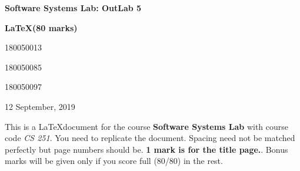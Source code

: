 \documentclass[a4paper, 12pt, fullpage]{article}
\begin{document}
\begin{titlepage}
   \begin{center}
       \vspace*{4cm}
 
       \huge \textbf{ Software Systems Lab: OutLab 5}
 
       \vspace{0.5cm}
        \huge \textbf{\LaTeX (80 marks)}
 
       \vspace{1.2cm}
 
       \Large {}
 
       \vspace{0.5cm}
      \normalsize 180050013
     
      \normalsize 180050085

      \normalsize 180050097 
      
      \vspace{1cm}
      
      \large 12 September, 2019
      
   \end{center}
\end{titlepage}

\newpage

\tableofcontents
{}
\newpage

This is a \LaTeX document for the course \textbf{Software Systems Lab} with course code \textsl{CS 251}. You need to replicate the document. Spacing need not be matched perfectly but page numbers should be. \textbf{1 mark is for the title page.}. Bonus marks will be given only if you score full (80/80) in the rest.
\end{document}

